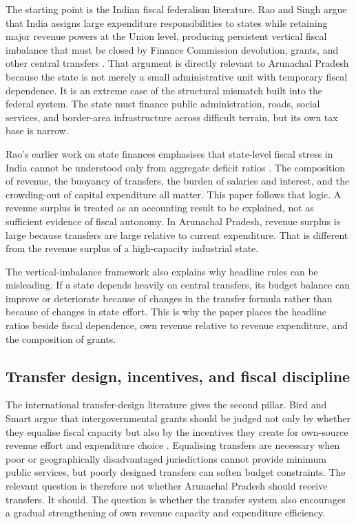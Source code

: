 \documentclass[11pt,a4paper]{article}
\begin{document}
The starting point is the Indian fiscal federalism literature. Rao and Singh argue that India assigns large expenditure responsibilities to states while retaining major revenue powers at the Union level, producing persistent vertical fiscal imbalance that must be closed by Finance Commission devolution, grants, and other central transfers \citep{rao_singh_2005}. That argument is directly relevant to Arunachal Pradesh because the state is not merely a small administrative unit with temporary fiscal dependence. It is an extreme case of the structural mismatch built into the federal system. The state must finance public administration, roads, social services, and border-area infrastructure across difficult terrain, but its own tax base is narrow.

Rao's earlier work on state finances emphasises that state-level fiscal stress in India cannot be understood only from aggregate deficit ratios \citep{rao_2002}. The composition of revenue, the buoyancy of transfers, the burden of salaries and interest, and the crowding-out of capital expenditure all matter. This paper follows that logic. A revenue surplus is treated as an accounting result to be explained, not as sufficient evidence of fiscal autonomy. In Arunachal Pradesh, revenue surplus is large because transfers are large relative to current expenditure. That is different from the revenue surplus of a high-capacity industrial state.

The vertical-imbalance framework also explains why headline rules can be misleading. If a state depends heavily on central transfers, its budget balance can improve or deteriorate because of changes in the transfer formula rather than because of changes in state effort. This is why the paper places the headline ratios beside fiscal dependence, own revenue relative to revenue expenditure, and the composition of grants.

\subsection{Transfer design, incentives, and fiscal discipline}

The international transfer-design literature gives the second pillar. Bird and Smart argue that intergovernmental grants should be judged not only by whether they equalise fiscal capacity but also by the incentives they create for own-source revenue effort and expenditure choice \citep{bird_smart_2002}. Equalising transfers are necessary when poor or geographically disadvantaged jurisdictions cannot provide minimum public services, but poorly designed transfers can soften budget constraints. The relevant question is therefore not whether Arunachal Pradesh should receive transfers. It should. The question is whether the transfer system also encourages a gradual strengthening of own revenue capacity and expenditure efficiency.
\end{document}
